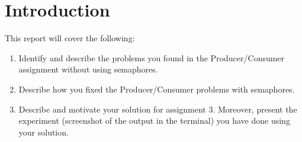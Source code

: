 \section{Introduction}
\label{section:intro}
This report will cover the following:
\begin{enumerate}
    \item Identify and describe the problems you found in the Producer/Consumer assignment without using semaphores.
    \item Describe how you fixed the Producer/Consumer problems with semaphores.
    \item Describe and motivate your solution for assignment 3. Moreover, present the experiment (screenshot of the output in the terminal) you have done using your solution.
\end{enumerate}
